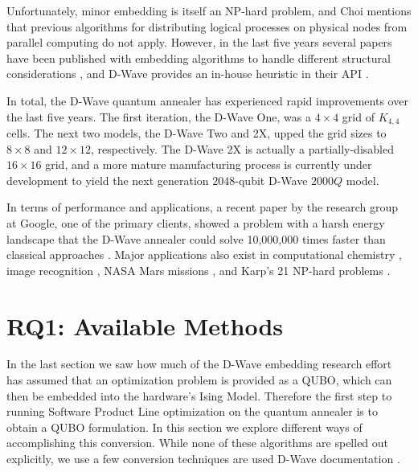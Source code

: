 \documentclass{sig-alternate-05-2015}
\begin{document}
Unfortunately, minor embedding is itself an NP-hard problem, and Choi mentions that previous algorithms for distributing logical processes on physical nodes from parallel computing do not apply. However, in the last five years several papers have been published with embedding algorithms to handle different structural considerations \cite{boothby2016fast, goodrich2016graph, klymko2014adiabatic}, and D-Wave provides an in-house heuristic in their API \cite{cai2014practical}.

In total, the D-Wave quantum annealer has experienced rapid improvements over the last five years. The first iteration, the D-Wave One, was a $4 \times 4$ grid of $K_{4,4}$ cells. The next two models, the D-Wave Two and 2X, upped the grid sizes to $8 \times 8$ and $12 \times 12$, respectively. The D-Wave 2X is actually a partially-disabled $16 \times 16$ grid, and a more mature manufacturing process is currently under development to yield the next generation $2048$-qubit D-Wave $2000Q$ model.

In terms of performance and applications, a recent paper by the research group at Google, one of the primary clients, showed a problem with a harsh energy landscape that the D-Wave annealer could solve 10,000,000 times faster than classical approaches \cite{denchev2015computational}. Major applications also exist in computational chemistry \cite{kassal2010simulating}, image recognition \cite{neven2008image}, NASA Mars missions \cite{venturelli2015quantum}, and Karp's 21 NP-hard problems \cite{lucas2013ising}.


\section{RQ1: Available Methods}

In the last section we saw how much of the D-Wave embedding research effort has assumed that an optimization problem is provided as a QUBO, which can then be embedded into the hardware's Ising Model. Therefore the first step to running Software Product Line optimization on the quantum annealer is to obtain a QUBO formulation. In this section we explore different ways of accomplishing this conversion. While none of these algorithms are spelled out explicitly, we use a few conversion techniques are used D-Wave documentation \cite{dwave}.
\end{document}
